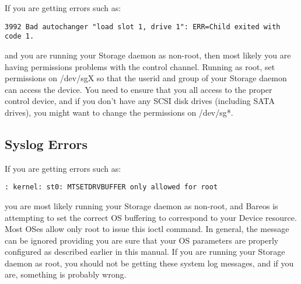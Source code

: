 {If you are getting errors such as:

\footnotesize
\begin{verbatim}
3992 Bad autochanger "load slot 1, drive 1": ERR=Child exited with code 1.
\end{verbatim}
\normalsize

and you are running your Storage daemon as non-root, then most likely
you are having permissions problems with the control channel. Running
as root, set permissions on /dev/sgX so that the userid and group of
your Storage daemon can access the device. You need to ensure that you
all access to the proper control device, and if you don't have any
SCSI disk drives (including SATA drives), you might want to change
the permissions on /dev/sg*.

\subsection{Syslog Errors}

If you are getting errors such as:

\footnotesize
\begin{verbatim}
: kernel: st0: MTSETDRVBUFFER only allowed for root
\end{verbatim}
\normalsize

you are most likely running your Storage daemon as non-root, and
Bareos is attempting to set the correct OS buffering to correspond
to your Device resource. Most OSes allow only root to issue this
ioctl command. In general, the message can be ignored providing
you are sure that your OS parameters are properly configured as
described earlier in this manual.  If you are running your Storage daemon
as root, you should not be getting these system log messages, and if
you are, something is probably wrong.
}
